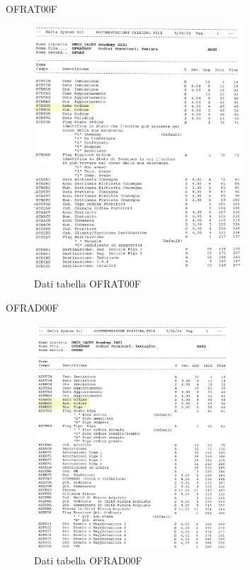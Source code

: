\documentclass[target=bach,aauheader=,style=]{thud}
\begin{document}
\newpage
OFRAT00F
\begin{figure}[H]
    \begin{center}
        \includegraphics[width=0.7\textwidth]{database/ofrat00f.jpg}
    \end{center}
    \caption{Dati tabella OFRAT00F}
\end{figure}

\newpage
OFRAD00F
\begin{figure}[H]
    \begin{center}
        \includegraphics[width=0.65\textwidth]{database/ofrad00f.jpg}
    \end{center}
    \caption{Dati tabella OFRAD00F}
\end{figure}
\end{document}
